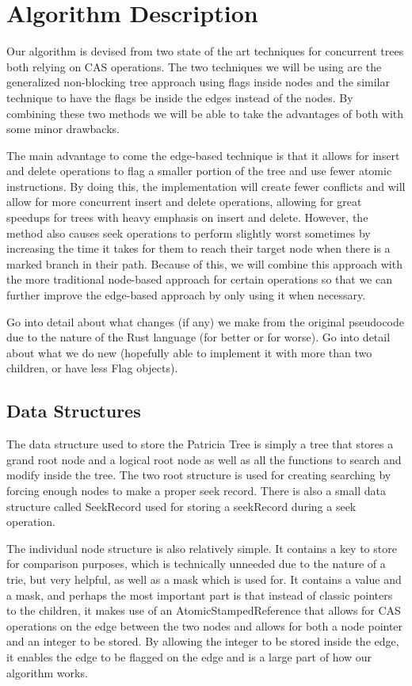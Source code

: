 \documentclass[conference]{IEEEtran}
\begin{document}
\section{Algorithm Description}
Our algorithm is devised from two state of the art techniques for concurrent trees both relying on CAS operations. The two techniques we will be using are the generalized non-blocking tree approach using flags inside nodes \cite{Shafiei2013,Brown2014} and the similar technique to have the flags be inside the edges instead of the nodes. \cite{Natarajan2014} By combining these two methods we will be able to take the advantages of both with some minor drawbacks.
\par
The main advantage to come the edge-based technique is that it allows for insert and delete operations to flag a smaller portion of the tree and use fewer atomic instructions. \cite{Natarajan2014} By doing this, the implementation will create fewer conflicts and will allow for more concurrent insert and delete operations, allowing for great speedups for trees with heavy emphasis on insert and delete. However, the method also causes seek operations to perform slightly worst sometimes by increasing the time it takes for them to reach their target node when there is a marked branch in their path. Because of this, we will combine this approach with the more traditional node-based approach for certain operations so that we can further improve the edge-based approach by only using it when necessary. 

Go into detail about what changes (if any) we make from the original pseudocode due to the nature of the Rust language (for better or for worse). Go into detail about what we do new (hopefully able to implement it with more than two children, or have less Flag objects).


\subsection{Data Structures}
The data structure used to store the Patricia Tree is simply a tree that stores a grand root node and a logical root node as well as all the functions to search and modify inside the tree. The two root structure is used for creating searching by forcing enough nodes to make a proper seek record. There is also a small data structure called SeekRecord used for storing a seekRecord during a seek operation.
\par
The individual node structure is also relatively simple. It contains a key to store for comparison purposes, which is technically unneeded due to the nature of a trie, but very helpful, as well as a mask which is used for. It contains a value and a mask, and perhaps the most important part is that instead of classic pointers to the children, it makes use of an AtomicStampedReference that allows for CAS operations on the edge between the two nodes and allows for both a node pointer and an integer to be stored. By allowing the integer to be stored inside the edge, it enables the edge to be flagged on the edge and is a large part of how our algorithm works.
\end{document}
